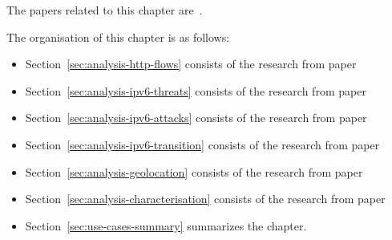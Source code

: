 \begin{chapintro}
The papers related to this chapter are~\cite{Husak-2015-Security, Hendriks-2017-Flow, Hendriks-2017-Threats, Elich-2013-Investigation, Celeda-2013-Large, Velan-2016-Network}.


The organisation of this chapter is as follows:
\begin{itemize}
  \item Section~\ref{sec:analysis-http-flows} consists of the research from paper~\cite{Husak-2015-Security}
  \item Section~\ref{sec:analysis-ipv6-threats} consists of the research from paper~\cite{Hendriks-2017-Flow}
  \item Section~\ref{sec:analysis-ipv6-attacks} consists of the research from paper~\cite{Hendriks-2017-Threats}
  \item Section~\ref{sec:analysis-ipv6-transition} consists of the research from paper~\cite{Elich-2013-Investigation}
  \item Section~\ref{sec:analysis-geolocation} consists of the research from paper~\cite{Celeda-2013-Large}
  \item Section~\ref{sec:analysis-characterisation} consists of the research from paper~\cite{Velan-2016-Network}
  \item Section~\ref{sec:use-cases-summary} summarizes the chapter.
\end{itemize}

\end{chapintro}

